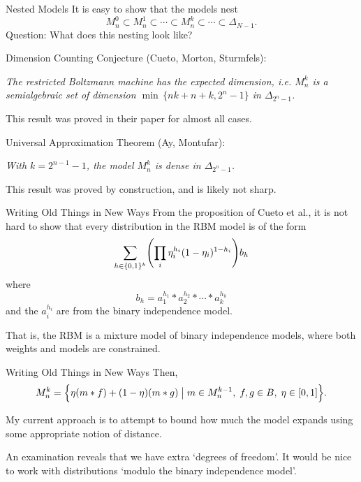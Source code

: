 \documentclass[mathserif,xcolor=dvipsnames]{beamer}
\begin{document}
\begin{frame}{Nested Models}
    It is easy to show that the models nest
    \[
        M_n^0 \subset M_n^1 \subset 
        \cdots \subset M_n^k \subset 
        \cdots \subset \Delta_{N-1}.
    \]
    Question: What does this nesting look like?
\end{frame}

\begin{frame}{Dimension Counting}
    Conjecture (Cueto, Morton, Sturmfels):
    
    \linespace
    \textit{The restricted Boltzmann machine has the expected dimension,
    i.e. $M_n^k$ is a semialgebraic set of dimension $\min\,\{nk + n + k, 2^n -
    1\}$ in $\Delta_{2^n - 1}$.
    }

    \linespace
    This result was proved in their paper for almost all cases.
\end{frame}

\begin{frame}{Universal Approximation}
    Theorem (Ay, Montufar):

    \linespace
    \textit{With $k = 2^{n-1} -1$, the model $M_n^k$ is dense in
    $\Delta_{2^n-1}$.}

    \linespace
    This result was proved by construction, and is likely not sharp.
\end{frame}


\begin{frame}{Writing Old Things in New Ways}
    From the proposition of Cueto et al., it is not hard to show that every
    distribution in the RBM model is of the form
    \[
        \sum_{h \in \{0,1\}^k}
        \pdil*{
            \prod_i \eta_i^{h_i} (1 - \eta_i)^{1 - h_i}
        } b_h
    \]
    where
    \[
        b_h = a_1^{h_1} * a_2^{h_2} * \cdots * a_k^{h_k}
    \]
    and the $a_i^{h_i}$ are from the binary independence model.

    \linespace
    That is, the RBM is a mixture model of binary independence models, where
    both weights and models are constrained.
\end{frame}

\begin{frame}{Writing Old Things in New Ways}
    Then,
    \[
        M_n^k = \cdil[\Big]{
            \eta(m * f) + (1 - \eta)(m * g)
            \;\big\vert\;
            m \in M_n^{k-1},\;
            f,g \in B,\;
            \eta \in [0,1]
        }.
    \]

    \linespace
    My current approach is to attempt to bound how much the model expands using
    some appropriate notion of distance.

    \linespace
    An examination reveals that we have extra `degrees of freedom'. It would be
    nice to work with distributions `modulo the binary independence model'.
\end{frame}
\end{document}
